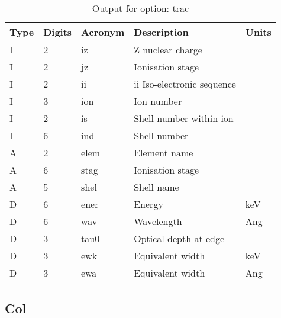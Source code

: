 \begin{table}[!p]
\caption{Output for option: trac}
\label{tabout:trac}
\begin{tabular}{lllll}
\hline
Type & Digits & Acronym & Description & Units \\ 
\hline
I &  2 & iz   & Z nuclear charge                 &                  \\
I &  2 & jz   & Ionisation stage                 &                  \\
I &  2 & ii   & ii Iso-electronic sequence       &                  \\
I &  3 & ion  & Ion number                       &                  \\
I &  2 & is   & Shell number within ion          &                  \\
I &  6 & ind  & Shell number                     &                  \\
A &  2 & elem & Element name                     &                  \\
A &  6 & stag & Ionisation stage                 &                  \\
A &  5 & shel & Shell name                       &                  \\
D &  6 & ener & Energy                           & keV              \\
D &  6 & wav  & Wavelength                       & Ang              \\
D &  3 & tau0 & Optical depth at edge            &                  \\
D &  3 & ewk  & Equivalent width                 & keV              \\
D &  3 & ewa  & Equivalent width                 & Ang              \\
\hline
\end{tabular}
\end{table}

\subsection{Col}

